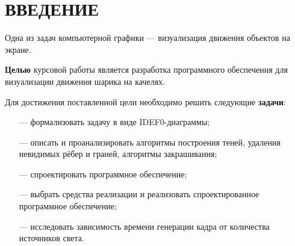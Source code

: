 \chapter*{ВВЕДЕНИЕ}

\fontsize{16}{19}\selectfont

Одна из задач компьютерной графики --- визуализация движения объектов на экране.

\textbf{Целью} курсовой работы является разработка программного обеспечения для визуализации движения шарика на качелях.

Для достижения поставленной цели необходимо решить следующие \textbf{задачи}:

\begin{enumerate}
	\item[---] формализовать задачу в виде IDEF0-диаграммы;
	\item[---] описать и проанализировать алгоритмы построения теней, удаления невидимых рёбер и граней, алгоритмы закрашивания;
	\item[---] спроектировать программное обеспечение;
	\item[---] выбрать средства реализации и реализовать спроектированное программное обеспечение; 
	\item[---] исследовать зависимость времени генерации кадра от количества источников света.
\end{enumerate}

\pagebreak
